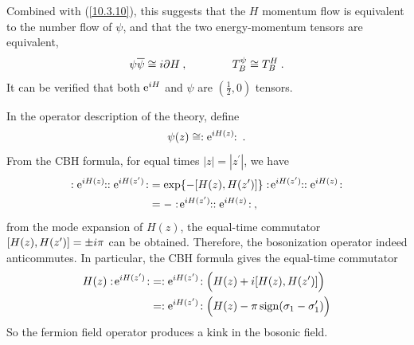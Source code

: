 	Combined with (\ref{10.3.10}), this suggests that the $H$ momentum flow is equivalent to the number flow of $\psi$, and that the two energy-momentum tensors are equivalent,
	\begin{equation}
		\psi\overline{\psi}\cong i\partial H\:, \qquad \qquad 
		T_{B}^{\psi}\cong T_{B}^{H} \:. \label{10.3.13}
	\end{equation}
	It can be verified that both $\mathrm{e}^{i H}$ and $\psi$ are $(\frac{1}{2},0)$ tensors.
	
	In the operator description of the theory, define
	\begin{equation}
		\psi(z)\cong \mathrel{:} \mathrm{e}^{i H(z)}\!\!\mathrel{:} \:.\label{10.3.14}
	\end{equation}
	From the CBH formula, for equal times $|z|=|z^{\prime}|$, we have
	\begin{align}
		\typecolon \me^{\mi H(z)}\!\!\typecolon  \typecolon \me^{\mi H(z^{\prime})}\!\typecolon 
		&=\exp\{-[H(z),H(z^{\prime})]\}\typecolon\! \me^{\mi H(z^{\prime})}\!\!\typecolon 
		\typecolon \me^{\mi H(z)}\!\typecolon \nonumber \\
		&=-\typecolon \!\me^{\mi H(z^{\prime})}\!\!\typecolon  \typecolon \me^{\mi H(z)}\!\typecolon \:,\label{10.3.15}
	\end{align}
	from the mode expansion of $H(z)$, the equal-time commutator $[H(z),H(z^{\prime})]=\pm i\pi$ can be obtained. Therefore, the bosonization operator indeed anticommutes. In particular, the CBH formula gives the equal-time commutator
	\begin{align}
		H(z)\mathrel{:}\!\mathrm{e}^{i H(z^{\prime})}\!\mathrel{:} &=\mathrel{:}\mathrm{e}^{i H(z^{\prime})}\!\mathrel{:} 
		\Bigl(H(z)+i[H(z),H(z^{\prime})]\Bigr) \nonumber \\
		&=\mathrel{:}\mathrm{e}^{i H(z^{\prime})}\!\mathrel{:} \Bigl(H(z)- \pi\,\mathrm{sign}(\sigma_{1}-\sigma_{1}^{\prime})\Bigr)
	\end{align}
	So the fermion field operator produces a kink in the bosonic field.
